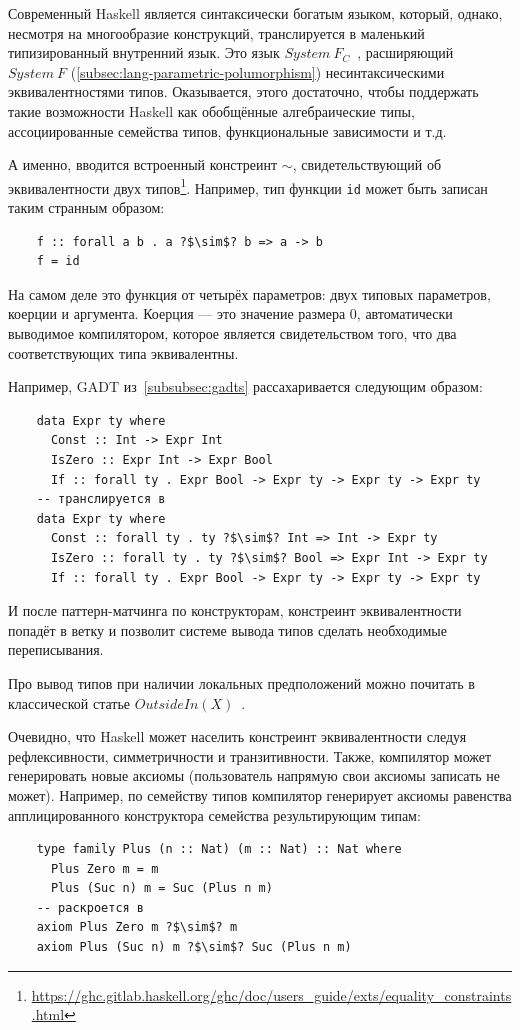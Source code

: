 Современный Haskell является синтаксически богатым языком, который, однако, несмотря на многообразие конструкций, транслируется в маленький типизированный внутренний язык.
Это язык $System~F_C$~\cite{sulzmann2007system}, расширяющий $System~F$ (\ref{subsec:lang-parametric-polumorphism}) несинтаксическими эквивалентностями типов.
Оказывается, этого достаточно, чтобы поддержать такие возможности Haskell как обобщённые алгебраические типы, ассоциированные семейства типов, функциональные зависимости и т.д.

А именно, вводится встроенный констреинт $\sim$, свидетельствующий об эквивалентности двух типов\footnote{\url{https://ghc.gitlab.haskell.org/ghc/doc/users_guide/exts/equality_constraints.html}}.
Например, тип функции \texttt{id} может быть записан таким странным образом:
\begin{verbatim}
    f :: forall a b . a ?$\sim$? b => a -> b
    f = id
\end{verbatim}
На самом деле это функция от четырёх параметров: двух типовых параметров, коерции и аргумента.
Коерция --- это значение размера 0, автоматически выводимое компилятором, которое является свидетельством того, что два соответствующих типа эквивалентны.

Например, GADT из~\ref{subsubsec:gadts} рассахаривается следующим образом:
\begin{verbatim}
    data Expr ty where
      Const :: Int -> Expr Int
      IsZero :: Expr Int -> Expr Bool
      If :: forall ty . Expr Bool -> Expr ty -> Expr ty -> Expr ty
    -- транслируется в
    data Expr ty where
      Const :: forall ty . ty ?$\sim$? Int => Int -> Expr ty
      IsZero :: forall ty . ty ?$\sim$? Bool => Expr Int -> Expr ty
      If :: forall ty . Expr Bool -> Expr ty -> Expr ty -> Expr ty
\end{verbatim}
И после паттерн-матчинга по конструкторам, констреинт эквивалентности попадёт в ветку и позволит системе вывода типов сделать необходимые переписывания.

Про вывод типов при наличии локальных предположений можно почитать в классической статье $OutsideIn(X)$~\cite{vytiniotis2011outsidein}.

Очевидно, что Haskell может населить констреинт эквивалентности следуя рефлексивности, симметричности и транзитивности.
Также, компилятор может генерировать новые аксиомы (пользователь напрямую свои аксиомы записать не может).
Например, по семейству типов компилятор генерирует аксиомы равенства апплицированного конструктора семейства результирующим типам:
\begin{verbatim}
    type family Plus (n :: Nat) (m :: Nat) :: Nat where
      Plus Zero m = m
      Plus (Suc n) m = Suc (Plus n m)
    -- раскроется в
    axiom Plus Zero m ?$\sim$? m
    axiom Plus (Suc n) m ?$\sim$? Suc (Plus n m)
\end{verbatim}

